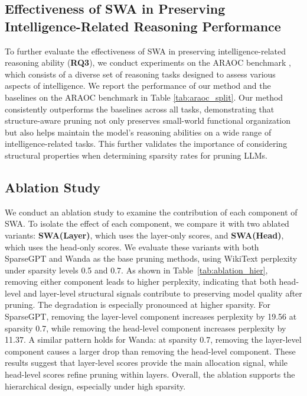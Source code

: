 \subsection{Effectiveness of SWA in Preserving Intelligence-Related Reasoning Performance}

To further evaluate the effectiveness of SWA in preserving intelligence-related reasoning ability (\textbf{RQ3}), we conduct experiments on the ARAOC benchmark \cite{wu2025understanding}, which consists of a diverse set of reasoning tasks designed to assess various aspects of intelligence. We report the performance of our method and the baselines on the ARAOC benchmark in Table \ref{tab:araoc_split}. Our method consistently outperforms the baselines across all tasks, demonstrating that structure-aware pruning not only preserves small-world functional organization but also helps maintain the model's reasoning abilities on a wide range of intelligence-related tasks. This further validates the importance of considering structural properties when determining sparsity rates for pruning LLMs.

\subsection{Ablation Study}

We conduct an ablation study to examine the contribution of each component of SWA. To isolate the effect of each component, we compare it with two ablated variants: \textbf{SWA(Layer)}, which uses the layer-only scores, and \textbf{SWA(Head)}, which uses the head-only scores. We evaluate these variants with both SparseGPT and Wanda as the base pruning methods, using WikiText perplexity under sparsity levels 0.5 and 0.7. As shown in Table~\ref{tab:ablation_hier}, removing either component leads to higher perplexity, indicating that both head-level and layer-level structural signals contribute to preserving model quality after pruning. The degradation is especially pronounced at higher sparsity. For SparseGPT, removing the layer-level component increases perplexity by 19.56 at sparsity 0.7, while removing the head-level component increases perplexity by 11.37. A similar pattern holds for Wanda: at sparsity 0.7, removing the layer-level component causes a larger drop than removing the head-level component. These results suggest that layer-level scores provide the main allocation signal, while head-level scores refine pruning within layers. Overall, the ablation supports the hierarchical design, especially under high sparsity.

